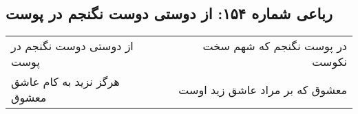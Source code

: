 \begin{center}
\section*{رباعی شماره ۱۵۴: از دوستی دوست نگنجم در پوست}
\label{sec:0154}
\begin{longtable}{l p{0.5cm} r}
از دوستی دوست نگنجم در پوست
&&
در پوست نگنجم که شهم سخت نکوست
\\
هرگز نزید به کام عاشق معشوق
&&
معشوق که بر مراد عاشق زید اوست
\\
\end{longtable}
\end{center}
